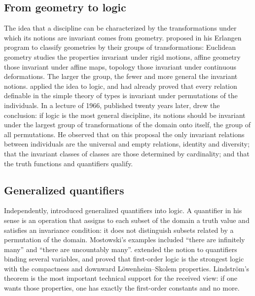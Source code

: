 \documentclass{situationist-preprint}
\begin{document}
\subsection{From geometry to logic}

The idea that a discipline can be characterized by the transformations under which its notions are invariant comes from geometry. \citet{Klein1872} proposed in his Erlangen program to classify geometries by their groups of transformations: Euclidean geometry studies the properties invariant under rigid motions, affine geometry those invariant under affine maps, topology those invariant under continuous deformations. The larger the group, the fewer and more general the invariant notions. \citet{Mautner1946} applied the idea to logic, and \citet{LindenbaumTarski1935} had already proved that every relation definable in the simple theory of types is invariant under permutations of the individuals. In a lecture of 1966, published twenty years later, \citet{Tarski1986} drew the conclusion: if logic is the most general discipline, its notions should be invariant under the largest group of transformations of the domain onto itself, the group of all permutations. He observed that on this proposal the only invariant relations between individuals are the universal and empty relations, identity and diversity; that the invariant classes of classes are those determined by cardinality; and that the truth functions and quantifiers qualify.

\subsection{Generalized quantifiers}

Independently, \citet{Mostowski1957} introduced generalized quantifiers into logic. A quantifier in his sense is an operation that assigns to each subset of the domain a truth value and satisfies an invariance condition: it does not distinguish subsets related by a permutation of the domain. Mostowski's examples included \enquote{there are infinitely many} and \enquote{there are uncountably many}. \citet{Lindstrom1966} extended the notion to quantifiers binding several variables, and \citet{Lindstrom1969} proved that first-order logic is the strongest logic with the compactness and downward L\"owenheim--Skolem properties. Lindstr\"om's theorem is the most important technical support for the received view: if one wants those properties, one has exactly the first-order constants and no more.
\end{document}
